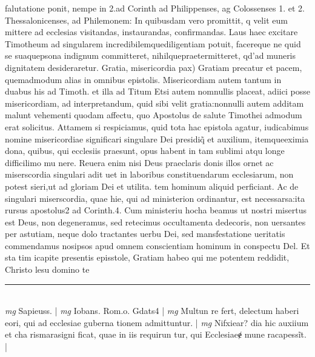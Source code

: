 \documentclass{article}
\begin{document}
\begin{pages}
falutatione ponit, nempe in 2.ad Corinth ad Philippenses, ag Colossenses 1. et 2. Thessalonicenses, ad Philemonem: In quibusdam vero promittit, q velit eum mittere ad ecclesias visitandas, instaurandas, confirmandas. Laus haec excitare Timotheum ad singularem incredibilemquediligentiam potuit, facereque  ne quid se suaquepsona indignum committeret, nihilquepraetermitteret, qd'ad muneris dignitatem desideraretur.  \pend\pstart Gratia, misericordia pax) Gratiam precatur et pacem, quemadmodum alias in omnibus epistolis. Misericordiam autem tantum in duabus his ad Timoth. et illa ad Titum Etsi autem nomnullis placeat, adiici posse misericordiam, ad interpretandum, quid sibi velit gratia:nonnulli autem additam malunt vehementi quodam affectu, quo Apostolus de salute Timothei admodum erat solicitus. Attamem si respiciamus, quid tota hac epistola agatur, iudicabimus nomine misericordiae significari singulare Dei presidiq̃ et auxilium, itemqueeximia dona, quibus, qui ecclesiis praesunt, opus habent in tam sublimi atqu longe difficilimo mu nere. Reuera enim nisi Deus praeclaris donis illos ornet ac miserscordia singulari adit uet in laboribus constituendarum ecclesiarum, non potest sieri,ut ad gloriam Dei et utilita. tem hominum aliquid perficiant. Ac de singulari miserscordia, quae hie, qui ad ministerion ordinantur, est necessarsa:ita rursus apostolus2 ad Corinth.4. Cum ministeriu hocha beamus ut nostri misertus est Deus, non degeneramus, sed retecimus occultamenta dedecoris, non uersantes per astutiam, neque  dolo tractantes uerbu Dei, sed mansfestatione ueritatis commendamus nosipsos apud omnem conscientiam hominum in conspectu Del. Et sta  tim icapite presentis episstole, Gratiam habeo qui me potentem reddidit, Christo lesu domino te  \pend
\vspace{0.5cm}\noindent
\vspace{0.2cm}\rule{1cm}{0.2pt}\\ 
\hspace{0.2cm}\textit{mg}
\footnotesize Sapieuss. 
\normalsize| 
\hspace{0.2cm}\textit{mg}
\footnotesize Iobans. Rom.o. Gdats4 
\normalsize| 
\hspace{0.2cm}\textit{mg}
\footnotesize Multun re fert, delectum haberi eori, qui ad ecclesiae guberna tionem admittuntur. 
\normalsize| 
\hspace{0.2cm}\textit{mg}
\footnotesize Nifxiear? dia hic auxiium et cha rismarasigni ficat, quae in iis requirun tur, qui Ecclesiaeɇ mune racapessĩt. 
\normalsize| 

\end{pages}
\end{document}

